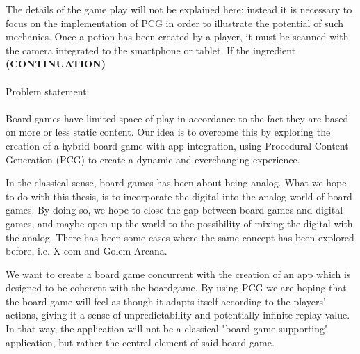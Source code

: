 The details of the game play will not be explained here; instead it is necessary to focus on the implementation of PCG in order to illustrate the potential of such mechanics. Once a potion has been created by a player, it must be scanned with the camera integrated to the smartphone or tablet. If the ingredient \textbf{(CONTINUATION)}\\\\Problem statement:\\\\
Board games have limited space of play in accordance to the fact they are based on more or less static content. Our idea is to overcome this by exploring the creation of a hybrid board game  with app integration, using Procedural Content Generation (PCG) to create a dynamic and everchanging experience.


In the classical sense, board games has been about being analog. What we hope to do with this thesis, is to incorporate the digital into the analog world of board games. By doing so, we hope to close the gap between board games and digital games, and maybe open up the world to the possibility of mixing the digital with the analog. There has been some cases where the same concept has been explored before, i.e. X-com and Golem Arcana.


We want to create a board game concurrent with the creation of an app which is designed to be coherent with the boardgame. By using PCG we are hoping that the board game will feel as though it adapts itself according to the players' actions, giving it a sense of unpredictability and potentially infinite replay value. In that way, the application will not be a classical "board game supporting" application, but rather the central element of said board game.



